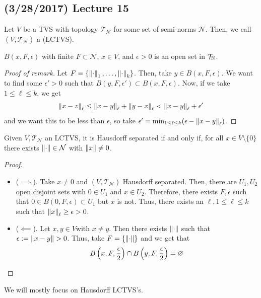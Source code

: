 \documentclass[11pt,leqno,oneside]{amsbook}
\numberwithin{thm}{section}
\newcommand{\Top}{\mathcal{T}} %
\newcommand{\cN}{\mathcal{N}}
\newcommand{\norms}{\cN}
\renewcommand{\emptyset}{\varnothing}
\begin{document}
\subsection*{(3/28/2017) Lecture 15}
\begin{defn}
  Let \(V\) be a TVS with topology \(\Top_\norms\) for some set of
  semi-norms \(\norms\). Then, we call \((V,\Top_\norms)\) a
   (LCTVS).
\end{defn}
\begin{rmk}
  \(B(x,F,\epsilon)\) with finite \(F \subset \norms\), \(x \in
  V\), and \(\epsilon > 0\) is an open set in \(\Top_\N\). 
\end{rmk}
\begin{proof}[Proof of remark]
  Let \(F = \{\norm_1, \ldots, \norm_k\}\). Then, take \(y \in
  B(x,F,\epsilon)\). We want to find some \(\epsilon' > 0\) such that
  \(B(y,F,\epsilon') \subset B(x,F,\epsilon)\). Now, if we take \(1
  \leq \ell \leq k\), we get \[
    \norm[x-z]_\ell \leq \norm[x-y]_\ell + \norm[y-x]_\ell <
    \norm[x-y]_\ell + \epsilon'
  \]
  and we want this to be less than \(\epsilon\), so take \(\epsilon' =
  \min_{1 \leq \ell \leq k}(\epsilon - \norm[x-y]_\ell)\).
\end{proof}
\begin{prop}
  Given \(V,\Top_\norms\) an LCTVS, it is Hausdorff separated if and
  only if, for all \(x \in V \setminus \{0\}\) there exists \(\norm
  \in \norms\) with \(\norm[x] \neq 0\). 
\end{prop}
\begin{proof}
  \begin{itemize}
  \item (\(\implies\)). Take \(x \neq 0\) and \((V,\Top_\norms)\)
    Hausdorff separated. Then, there are \(U_1,U_2\) open disjoint
    sets with \(0 \in U_1\) and \(x \in U_2\). Therefore, there exists
    \(F,\epsilon\) such that \(0 \in B(0,F,\epsilon) \subset U_1\) but
    \(x\) is not. Thus, there exists an \(\ell, 1 \leq \ell \leq k\)
    such that \(\norm[x]_\ell \geq \epsilon > 0\).
  \item (\(\impliedby\)). Let \(x,y \in V\)with \(x \neq y\). Then
    there exists \(\norm\) such that \(\epsilon := \norm[x-y] >
    0\). Thus, take \(F = \{\norm\}\) and we get that \[
      B\left(x,F,\frac{\epsilon}{2}\right) \intersect B\left(y,F,\frac{\epsilon}{2}\right) = \emptyset
    \]
  \end{itemize}
\end{proof}
We will mostly focus on Hausdorff LCTVS's.
\end{document}
